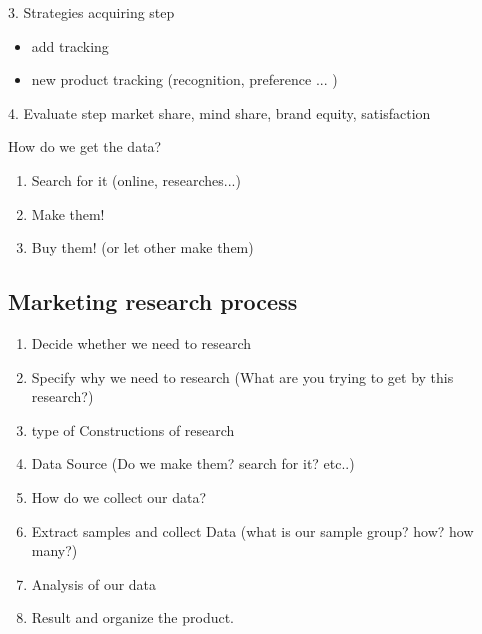 \documentclass[12pt]{article}
\begin{document}
3. Strategies acquiring step
\begin{itemize}
	\item add tracking
	\item new product tracking (recognition, preference ... )
\end{itemize}

4. Evaluate step
market share, mind share, brand equity, satisfaction



How do we get the data?
\begin{enumerate}
	\item Search for it (online, researches...)
	\item Make them!
	\item Buy them! (or let other make them)
\end{enumerate}

\subsection{Marketing research process}

\begin{enumerate}
	\item Decide whether we need to research
	\item Specify why we need to research (What are you trying to get by this research?)
	\item type of Constructions of research
	\item Data Source (Do we make them? search for it? etc..)
	\item How do we collect our data?
	\item Extract samples and collect Data (what is our sample group? how? how many?)
	\item Analysis of our data
	\item Result and organize the product.
\end{enumerate}
\end{document}
